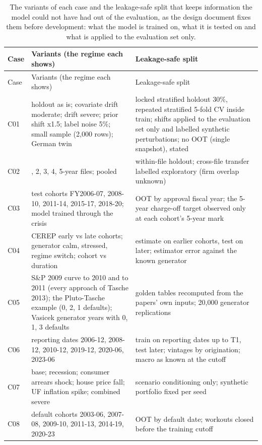 {\footnotesize
\setlength{\tabcolsep}{3pt}
\renewcommand{\arraystretch}{1.12}
\begin{longtable}{l>{\raggedright\arraybackslash}p{6.2cm}>{\raggedright\arraybackslash}p{8.0cm}}
\caption{The variants of each case and the leakage-safe split that keeps information the model could not have had out of the evaluation, as the design document fixes them before development: what the model is trained on, what it is tested on and what is applied to the evaluation set only.}\label{tab:data-splits}\\
\toprule
Case & Variants (the regime each shows) & Leakage-safe split \\
\midrule
\endfirsthead
\toprule
Case & Variants (the regime each shows) & Leakage-safe split \\
\midrule
\endhead
\bottomrule
\endfoot
C01 & holdout as is; covariate drift moderate; drift severe; prior shift x1.5; label noise 5\%; small sample (2,000 rows); German twin & locked stratified holdout 30\%, repeated stratified 5-fold CV inside train; shifts applied to the evaluation set only and labelled synthetic perturbations; no OOT (single snapshot), stated \\
C02 & 1, 2, 3, 4, 5-year files; pooled & within-file holdout; cross-file transfer labelled exploratory (firm overlap unknown) \\
C03 & test cohorts FY2006-07, 2008-10, 2011-14, 2015-17, 2018-20; model trained through the crisis & OOT by approval fiscal year; the 5-year charge-off target observed only at each cohort's 5-year mark \\
C04 & CEREP early vs late cohorts; generator calm, stressed, regime switch; cohort vs duration & estimate on earlier cohorts, test on later; estimator error against the known generator \\
C05 & S\&P 2009 curve to 2010 and to 2011 (every approach of Tasche 2013); the Pluto-Tasche example (0, 2, 1 defaults); Vasicek generator years with 0, 1, 3 defaults & golden tables recomputed from the papers' own inputs; 20,000 generator replications \\
C06 & reporting dates 2006-12, 2008-12, 2010-12, 2019-12, 2020-06, 2023-06 & train on reporting dates up to T1, test later; vintages by origination; macro as known at the cutoff \\
C07 & base; recession; consumer arrears shock; house price fall; UF inflation spike; combined severe & scenario conditioning only; synthetic portfolio fixed per seed \\
C08 & default cohorts 2003-06, 2007-08, 2009-10, 2011-13, 2014-19, 2020-23 & OOT by default date; workouts closed before the training cutoff \\

\end{longtable}}
